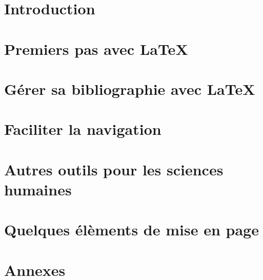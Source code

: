 \frontmatter
\part{Introduction}



\mainmatter

\part{Premiers pas avec \LaTeX}









\part{Gérer sa bibliographie avec \LaTeX}\label{bibliographie}








\part{Faciliter la navigation}




\part{Autres outils pour les sciences humaines}



\part{Quelques élèments de mise en page}





\appendix
\part{Annexes}











\setcounter{tocdepth}{2}
\tableofcontents
